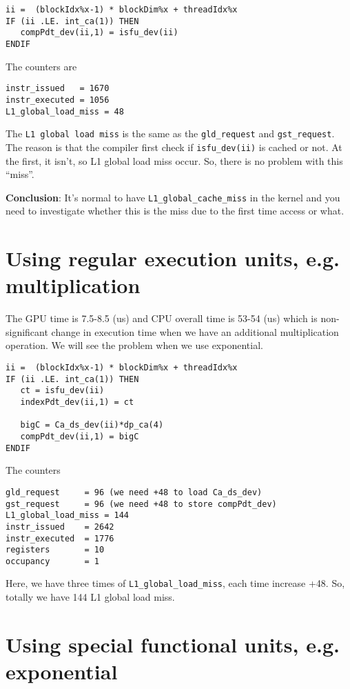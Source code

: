 \begin{lstlisting}
ii =  (blockIdx%x-1) * blockDim%x + threadIdx%x
IF (ii .LE. int_ca(1)) THEN
   compPdt_dev(ii,1) = isfu_dev(ii)
ENDIF
\end{lstlisting}
The counters are
\begin{verbatim}
instr_issued   = 1670
instr_executed = 1056
L1_global_load_miss = 48
\end{verbatim}
The \verb!L1 global load miss! is the same as the \verb!gld_request!
and \verb!gst_request!. The reason is that the compiler first check if
\verb!isfu_dev(ii)! is cached or not. At the first, it isn't, so L1
global load miss occur. So, there is no problem with this ``miss''. 

\begin{framed}
  {\bf Conclusion}: It's normal to have \verb!L1_global_cache_miss! in
  the kernel and you need to investigate whether this is the miss due
  to the first time access or what. 
\end{framed}

\section{Using regular execution units, e.g. multiplication}
\label{sec:multiplication}

The GPU time is 7.5-8.5 (us) and CPU overall time is 53-54 (us) which
is non-significant change in execution time when we have an additional
multiplication operation. We will see the problem when we use
exponential. 
\begin{lstlisting}
ii =  (blockIdx%x-1) * blockDim%x + threadIdx%x
IF (ii .LE. int_ca(1)) THEN
   ct = isfu_dev(ii)
   indexPdt_dev(ii,1) = ct
   
   bigC = Ca_ds_dev(ii)*dp_ca(4)
   compPdt_dev(ii,1) = bigC
ENDIF
\end{lstlisting}
The counters
\begin{lstlisting}
gld_request     = 96 (we need +48 to load Ca_ds_dev)
gst_request     = 96 (we need +48 to store compPdt_dev)
L1_global_load_miss = 144 
instr_issued    = 2642
instr_executed  = 1776
registers       = 10
occupancy       = 1
\end{lstlisting}
Here, we have three times of \verb!L1_global_load_miss!, each time
increase +48. So, totally we have 144 L1 global load miss. 

\section{Using special functional units, e.g. exponential}
\label{sec:using-spec-funct}

